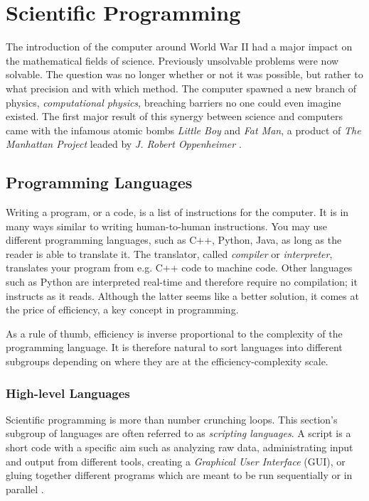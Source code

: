 \chapter{Scientific Programming}

The introduction of the computer around World War II had a major impact on the mathematical fields of science. Previously unsolvable problems were now  solvable. The question was no longer whether or not it was possible, but rather to what precision and with which method. The computer spawned a new branch of physics, \textit{computational physics}, breaching barriers no one could even imagine existed. The first major result of this synergy between science and computers came with the infamous atomic bombs \textit{Little Boy} and \textit{Fat Man}, a product of \textit{The Manhattan Project} leaded by \textit{J. Robert Oppenheimer} \cite{supermen}.

\section{Programming Languages}

Writing a program, or a code, is a list of instructions for the computer. It is in many ways similar to writing human-to-human instructions. You may use different programming languages, such as C++, Python, Java, as long as the reader is able to translate it. The translator, called \textit{compiler} or \textit{interpreter}, translates your program from e.g. C++ code to machine code. Other languages such as Python are interpreted real-time and therefore require no compilation; it instructs as it reads. Although the latter seems like a better solution, it comes at the price of efficiency, a key concept in programming. 

As a rule of thumb, efficiency is inverse proportional to the complexity of the programming language. It is therefore natural to sort languages into different subgroups depending on where they are at the efficiency-complexity scale.


\subsection{High-level Languages}

Scientific programming is more than number crunching loops. This section's subgroup of languages are often referred to as \textit{scripting languages}. A script is a short code with a specific aim such as analyzing raw data, administrating input and output from different tools, creating a \textit{Graphical User Interface} (GUI), or gluing together different programs which are meant to be run sequentially or in parallel \cite{inf3331}.

